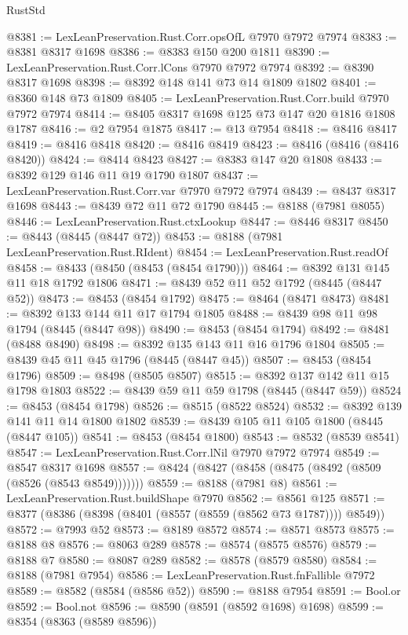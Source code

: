\begin{lexlean}{RustStd}
\begin{coremodule}
@8381 := LexLeanPreservation.Rust.Corr.opsOfL @7970 @7972 @7974
@8383 := @8381 @8317 @1698
@8386 := @8383 @150 @200 @1811
@8390 := LexLeanPreservation.Rust.Corr.lCons @7970 @7972 @7974
@8392 := @8390 @8317 @1698
@8398 := @8392 @148 @141 @73 @14 @1809 @1802
@8401 := @8360 @148 @73 @1809
@8405 := LexLeanPreservation.Rust.Corr.build @7970 @7972 @7974
@8414 := @8405 @8317 @1698 @125 @73 @147 @20 @1816 @1808 @1787
@8416 := @2 @7954 @1875
@8417 := @13 @7954
@8418 := @8416 @8417
@8419 := @8416 @8418
@8420 := @8416 @8419
@8423 := @8416 (@8416 (@8416 @8420))
@8424 := @8414 @8423
@8427 := @8383 @147 @20 @1808
@8433 := @8392 @129 @146 @11 @19 @1790 @1807
@8437 := LexLeanPreservation.Rust.Corr.var @7970 @7972 @7974
@8439 := @8437 @8317 @1698
@8443 := @8439 @72 @11 @72 @1790
@8445 := @8188 (@7981 @8055)
@8446 := LexLeanPreservation.Rust.ctxLookup
@8447 := @8446 @8317
@8450 := @8443 (@8445 (@8447 @72))
@8453 := @8188 (@7981 LexLeanPreservation.Rust.RIdent)
@8454 := LexLeanPreservation.Rust.readOf
@8458 := @8433 (@8450 (@8453 (@8454 @1790)))
@8464 := @8392 @131 @145 @11 @18 @1792 @1806
@8471 := @8439 @52 @11 @52 @1792 (@8445 (@8447 @52))
@8473 := @8453 (@8454 @1792)
@8475 := @8464 (@8471 @8473)
@8481 := @8392 @133 @144 @11 @17 @1794 @1805
@8488 := @8439 @98 @11 @98 @1794 (@8445 (@8447 @98))
@8490 := @8453 (@8454 @1794)
@8492 := @8481 (@8488 @8490)
@8498 := @8392 @135 @143 @11 @16 @1796 @1804
@8505 := @8439 @45 @11 @45 @1796 (@8445 (@8447 @45))
@8507 := @8453 (@8454 @1796)
@8509 := @8498 (@8505 @8507)
@8515 := @8392 @137 @142 @11 @15 @1798 @1803
@8522 := @8439 @59 @11 @59 @1798 (@8445 (@8447 @59))
@8524 := @8453 (@8454 @1798)
@8526 := @8515 (@8522 @8524)
@8532 := @8392 @139 @141 @11 @14 @1800 @1802
@8539 := @8439 @105 @11 @105 @1800 (@8445 (@8447 @105))
@8541 := @8453 (@8454 @1800)
@8543 := @8532 (@8539 @8541)
@8547 := LexLeanPreservation.Rust.Corr.lNil @7970 @7972 @7974
@8549 := @8547 @8317 @1698
@8557 := @8424 (@8427 (@8458 (@8475 (@8492 (@8509 (@8526 (@8543 @8549)))))))
@8559 := @8188 (@7981 @8)
@8561 := LexLeanPreservation.Rust.buildShape @7970
@8562 := @8561 @125
@8571 := @8377 (@8386 (@8398 (@8401 (@8557 (@8559 (@8562 @73 @1787)))) @8549))
@8572 := @7993 @52
@8573 := @8189 @8572
@8574 := @8571 @8573
@8575 := @8188 @8
@8576 := @8063 @289
@8578 := @8574 (@8575 @8576)
@8579 := @8188 @7
@8580 := @8087 @289
@8582 := @8578 (@8579 @8580)
@8584 := @8188 (@7981 @7954)
@8586 := LexLeanPreservation.Rust.fnFallible @7972
@8589 := @8582 (@8584 (@8586 @52))
@8590 := @8188 @7954
@8591 := Bool.or
@8592 := Bool.not
@8596 := @8590 (@8591 (@8592 @1698) @1698)
@8599 := @8354 (@8363 (@8589 @8596))

\end{coremodule}
\end{lexlean}
